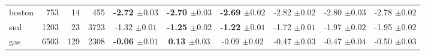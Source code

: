 \begin{table*}
\begin{threeparttable}
\begin{tabular}{lrrrcccccc}
    \textsf{boston} & 753 & 14 & 455 & {\bf-2.72 {\scriptsize{\(\pm 0.03\)}}} & {\bf-2.70 {\scriptsize{\(\pm 0.03\)}}} & {\bf-2.69 {\scriptsize{\(\pm 0.02\)}}} & {-2.82 {\scriptsize{\(\pm 0.02\)}}} & {-2.80 {\scriptsize{\(\pm 0.03\)}}} & {-2.78 {\scriptsize{\(\pm 0.02\)}}}\\
    \textsf{sml} & 1203 & 23 & 3723 & {-1.32 {\scriptsize{\(\pm 0.01\)}}} & {\bf-1.25 {\scriptsize{\(\pm 0.02\)}}} & {\bf-1.22 {\scriptsize{\(\pm 0.01\)}}} & {-1.72 {\scriptsize{\(\pm 0.01\)}}} & {-1.97 {\scriptsize{\(\pm 0.02\)}}} & {-1.95 {\scriptsize{\(\pm 0.02\)}}} \\
    \textsf{gas} & 6503 & 129 & 2308 & {\bf-0.06 {\scriptsize{\(\pm 0.01\)}}} & {\bf 0.13 {\scriptsize{\(\pm 0.03\)}}} & {-0.09 {\scriptsize{\(\pm 0.02\)}}} & {-0.47 {\scriptsize{\(\pm 0.03\)}}} & {-0.47 {\scriptsize{\(\pm 0.04\)}}} & {-0.50 {\scriptsize{\(\pm 0.03\)}}}\\
    \bottomrule
 \end{tabular}
  \end{threeparttable}
  \vspace{-0.1in}
\end{table*}

